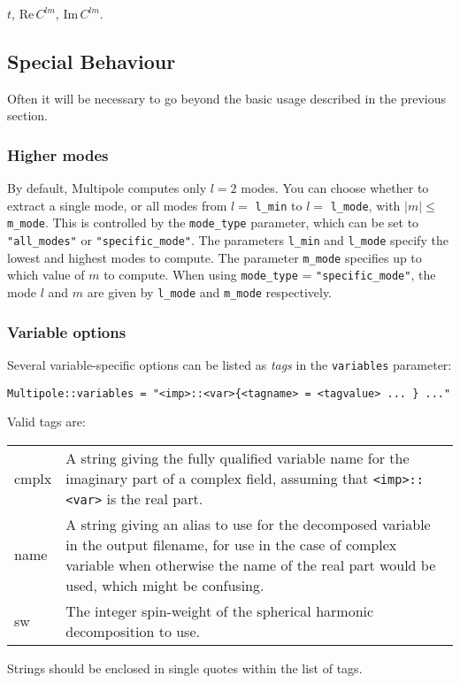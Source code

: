 \documentclass{article}
\begin{document}
$t$, $\mathrm{Re} \, C^{lm}$, $\mathrm{Im} \, C^{lm}$.

\subsection{Special Behaviour}
Often it will be necessary to go beyond the basic usage described in the
previous section.

\subsubsection{Higher modes}
By default, Multipole computes only $l = 2$ modes.  You can choose
whether to extract a single mode, or all modes from $l = $
\verb|l_min| to $l = $ \verb|l_mode|, with $|m| \le $ \verb|m_mode|.
This is controlled by the \verb|mode_type| parameter, which can be set
to \verb|"all_modes"| or \verb|"specific_mode"|.  The parameters
\verb|l_min| and \verb|l_mode| specify the lowest and highest modes to
compute.  The parameter \verb|m_mode| specifies up to which value of
$m$ to compute.  When using \verb|mode_type| = \verb|"specific_mode"|,
the mode $l$ and $m$ are given by \verb|l_mode| and \verb|m_mode|
respectively.

\subsubsection{Variable options}
Several variable-specific options can be listed as {\em tags} in the
\verb|variables| parameter:
\begin{verbatim}
Multipole::variables = "<imp>::<var>{<tagname> = <tagvalue> ... } ..."
\end{verbatim}
Valid tags are:

\begin{tabular}{lp{}}
  cmplx & A string giving the fully qualified variable name for the imaginary part of a complex field, assuming that \verb|<imp>::<var>| is the real part. \\
  name & A string giving an alias to use for the decomposed variable in the output filename, for use in the case of complex variable when otherwise the name of the real part would be used, which might be confusing. \\
  sw & The integer spin-weight of the spherical harmonic decomposition to use.
\end{tabular}

Strings should be enclosed in single quotes within the list of tags.
\end{document}
